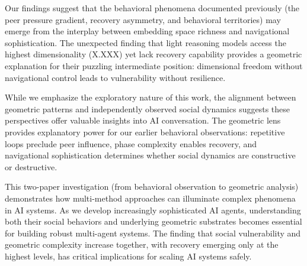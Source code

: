 \documentclass[11pt,letterpaper]{article}
\newcommand{\lightIntrinsicDim}{X.XXX}
\begin{document}
Our findings suggest that the behavioral phenomena documented previously (the peer pressure gradient, recovery asymmetry, and behavioral territories) may emerge from the interplay between embedding space richness and navigational sophistication. The unexpected finding that light reasoning models access the highest dimensionality (\lightIntrinsicDim{}) yet lack recovery capability provides a geometric explanation for their puzzling intermediate position: dimensional freedom without navigational control leads to vulnerability without resilience.

While we emphasize the exploratory nature of this work, the alignment between geometric patterns and independently observed social dynamics suggests these perspectives offer valuable insights into AI conversation. The geometric lens provides explanatory power for our earlier behavioral observations: repetitive loops preclude peer influence, phase complexity enables recovery, and navigational sophistication determines whether social dynamics are constructive or destructive.

This two-paper investigation (from behavioral observation to geometric analysis) demonstrates how multi-method approaches can illuminate complex phenomena in AI systems. As we develop increasingly sophisticated AI agents, understanding both their social behaviors and underlying geometric substrates becomes essential for building robust multi-agent systems. The finding that social vulnerability and geometric complexity increase together, with recovery emerging only at the highest levels, has critical implications for scaling AI systems safely.




\end{document}
